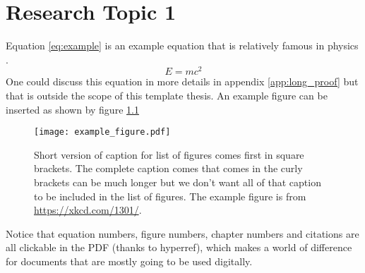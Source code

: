 \chapter{Research Topic 1}
\label{cha:research_topic_1}

Equation \ref{eq:example} is an example equation that is relatively famous in physics \cite{einstein_ist_1905}. 
\begin{equation}
    \label{eq:example}
    E = m c^2
\end{equation}
One could discuss this equation in more details in appendix \ref{app:long_proof} but that is outside the scope of this template thesis. 
An example figure can be inserted as shown by figure \ref{fig:example_figure}
\begin{figure}[!htb]
    \centering
    \texttt{[image: example\_figure.pdf]}
    \caption[Short version of caption for list of figures comes first in brackets.]{
    Short version of caption for list of figures comes first in square brackets. The complete caption comes that comes in the curly brackets can be much longer but we don't want all of that caption to be included in the list of figures. 
    The example figure is from \url{https://xkcd.com/1301/}.
    }
    \label{fig:example_figure}
\end{figure}
Notice that equation numbers, figure numbers, chapter numbers and citations are all clickable in the PDF (thanks to hyperref), which makes a world of difference for documents that are mostly going to be used digitally.

\paragraph{}
\Blindtext[2]
